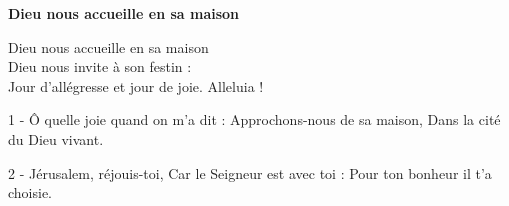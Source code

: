 \textbf{Dieu nous accueille en sa maison}

Dieu nous accueille en sa maison\\
Dieu nous invite à son festin :\\
Jour d'allégresse et jour de joie.
Alleluia !

1 - Ô quelle joie quand on m'a dit :
\og Approchons-nous de sa maison,
Dans la cité du Dieu vivant.\fg{}

2 - Jérusalem, réjouis-toi,
Car le Seigneur est avec toi :
Pour ton bonheur il t'a choisie.

%
%
%
%
